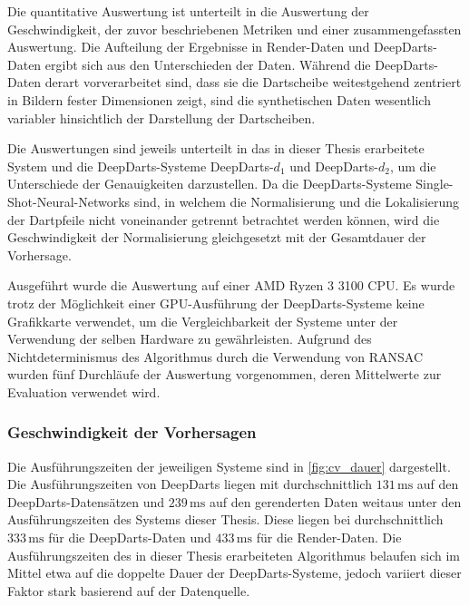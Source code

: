 Die quantitative Auswertung ist unterteilt in die Auswertung der Geschwindigkeit, der zuvor beschriebenen Metriken und einer zusammengefassten Auswertung. Die Aufteilung der Ergebnisse in Render-Daten und DeepDarts-Daten ergibt sich aus den Unterschieden der Daten. Während die DeepDarts-Daten derart vorverarbeitet sind, dass sie die Dartscheibe weitestgehend zentriert in Bildern fester Dimensionen zeigt, sind die synthetischen Daten wesentlich variabler hinsichtlich der Darstellung der Dartscheiben.

Die Auswertungen sind jeweils unterteilt in das in dieser Thesis erarbeitete System und die DeepDarts-Systeme DeepDarts-$d_1$ und DeepDarts-$d_2$, um die Unterschiede der Genauigkeiten darzustellen. Da die DeepDarts-Systeme Single-Shot-Neural-Networks sind, in welchem die Normalisierung und die Lokalisierung der Dartpfeile nicht voneinander getrennt betrachtet werden können, wird die Geschwindigkeit der Normalisierung gleichgesetzt mit der Gesamtdauer der Vorhersage.

Ausgeführt wurde die Auswertung auf einer AMD Ryzen 3 3100 CPU. Es wurde trotz der Möglichkeit einer GPU-Ausführung der DeepDarts-Systeme keine Grafikkarte verwendet, um die Vergleichbarkeit der Systeme unter der Verwendung der selben Hardware zu gewährleisten. Aufgrund des Nichtdeterminismus des Algorithmus durch die Verwendung von RANSAC wurden fünf Durchläufe der Auswertung vorgenommen, deren Mittelwerte zur Evaluation verwendet wird.

\subsubsection{Geschwindigkeit der Vorhersagen} %

\ExecutionTimes

Die Ausführungszeiten der jeweiligen Systeme sind in \autoref{fig:cv_dauer} dargestellt. Die Ausführungszeiten von DeepDarts liegen mit durchschnittlich $131\,\text{ms}$ auf den DeepDarts-Datensätzen und $239\,\text{ms}$ auf den gerenderten Daten weitaus unter den Ausführungszeiten des Systems dieser Thesis. Diese liegen bei durchschnittlich $333\,\text{ms}$ für die DeepDarts-Daten und $433\,\text{ms}$ für die Render-Daten. Die Ausführungszeiten des in dieser Thesis erarbeiteten Algorithmus belaufen sich im Mittel etwa auf die doppelte Dauer der DeepDarts-Systeme, jedoch variiert dieser Faktor stark basierend auf der Datenquelle.

